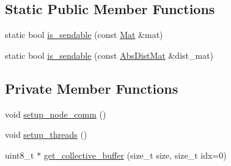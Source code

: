 \subsection*{Static Public Member Functions}
\begin{DoxyCompactItemize}
\item 
static bool \hyperlink{classlbann_1_1lbann__comm_a4ba1b9a6b4eb986a348d85c2d80ca3eb}{is\+\_\+sendable} (const \hyperlink{base_8hpp_a68f11fdc31b62516cb310831bbe54d73}{Mat} \&mat)
\item 
static bool \hyperlink{classlbann_1_1lbann__comm_ac6addefb7577f81fbc90da94d26991e4}{is\+\_\+sendable} (const \hyperlink{base_8hpp_a9a697a504ae84010e7439ffec862b470}{Abs\+Dist\+Mat} \&dist\+\_\+mat)
\end{DoxyCompactItemize}
\subsection*{Private Member Functions}
\begin{DoxyCompactItemize}
\item 
void \hyperlink{classlbann_1_1lbann__comm_a44bc6b8683f04c2a3fc2f01fc734a946}{setup\+\_\+node\+\_\+comm} ()
\item 
void \hyperlink{classlbann_1_1lbann__comm_a597189b10f61947580f97fb8d1da7355}{setup\+\_\+threads} ()
\item 
uint8\+\_\+t $\ast$ \hyperlink{classlbann_1_1lbann__comm_ae925ac5eaf2895717c709b252961b3bf}{get\+\_\+collective\+\_\+buffer} (size\+\_\+t size, size\+\_\+t idx=0)
\end{DoxyCompactItemize}
